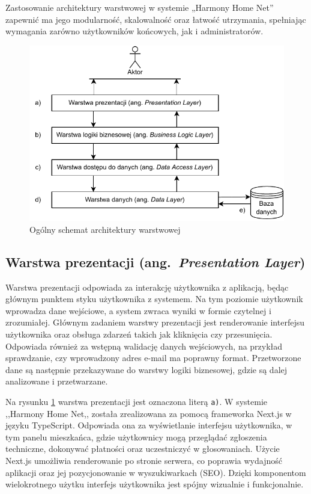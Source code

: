 Zastosowanie architektury warstwowej w systemie „Harmony Home Net” zapewnić ma jego modularność, skalowalność oraz łatwość utrzymania, spełniając wymagania zarówno użytkowników końcowych, jak i administratorów.
\begin{figure}[t]
    \centering
    \includegraphics[scale=1]{rys03/diagram_architektury_warstwowej}
    \caption{Ogólny schemat architektury warstwowej}
    \label{fig:n_tier_arch}
\end{figure}

\subsection{Warstwa prezentacji (ang.\ \emph{Presentation Layer})}
Warstwa prezentacji odpowiada za interakcję użytkownika z aplikacją, będąc głównym punktem styku użytkownika z systemem. Na tym poziomie użytkownik wprowadza dane wejściowe, a system zwraca wyniki w formie czytelnej i zrozumiałej. Głównym zadaniem warstwy prezentacji jest renderowanie interfejsu użytkownika oraz obsługa zdarzeń takich jak kliknięcia czy przesunięcia. Odpowiada również za wstępną walidację danych wejściowych, na przykład sprawdzanie, czy wprowadzony adres e-mail ma poprawny format. Przetworzone dane są następnie przekazywane do warstwy logiki biznesowej, gdzie są dalej analizowane i przetwarzane.

Na rysunku \ref{fig:n_tier_arch} warstwa prezentacji jest oznaczona literą \texttt{a)}. W systemie ,,Harmony Home Net,, została zrealizowana za pomocą frameworka Next.js w języku TypeScript. Odpowiada ona za wyświetlanie interfejsu użytkownika, w tym panelu mieszkańca, gdzie użytkownicy mogą przeglądać zgłoszenia techniczne, dokonywać płatności oraz uczestniczyć w głosowaniach. Użycie Next.js umożliwia renderowanie po stronie serwera, co poprawia wydajność aplikacji oraz jej pozycjonowanie w wyszukiwarkach (SEO). Dzięki komponentom wielokrotnego użytku interfejs użytkownika jest spójny wizualnie i funkcjonalnie. 

